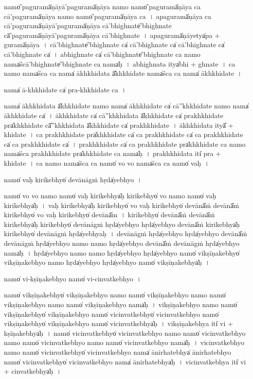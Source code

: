 \documentclass[parskip, DIV=14]{scrartcl}
\begin{document}
{namo̍'pagu॒ramā̍ṇāyā'pagu॒ramā̍ṇāya॒ namo॒ namo̍'pagu॒ramā̍ṇāya ca cā'pagu॒ramā̍ṇāya॒ namo॒ namo̍'pagu॒ramā̍ṇāya ca~। %
a॒pa॒gu॒ramā̍ṇāya ca cā'pagu॒ramā̍ṇāyā'pagu॒ramā̍ṇāya cā'bhi॒ghnate̍'bhighna॒te cā̍'pagu॒ramā̍ṇāyā'pagu॒ramā̍ṇāya cā'bhi॒ghnate~।%
a॒pa॒gu॒ramā̍ṇā॒yetya̍pa + gu॒ramā̍ṇāya~।
cā॒'bhi॒ghna॒te̍'bhighna॒te ca̍ cā'bhighna॒te ca̍ cā'bhighna॒te ca̍ cā'bhighna॒te ca̍~। %
a॒bhi॒ghna॒te ca̍ cā'bhighna॒te̍'bhighna॒te ca॒ namo॒ nama̍ścā'bhighna॒te̍'bhighna॒te ca॒ nama̍ḥ~।
a॒bhi॒ghna॒ta itya̍bhi + ghna॒te~।
ca॒ namo॒ nama̍śca ca॒ nama̍ ākhkhida॒ta ā̎khkhida॒te nama̍śca ca॒ nama̍ ākhkhida॒te~।

nama̍ ā-khkhida॒te ca̍ pra-khkhida॒te ca~।

nama̍ ākhkhida॒ta ā̎khkhida॒te namo॒ nama̍ ākhkhida॒te ca̍ cā''khkhida॒te namo॒ nama̍ ākhkhida॒te ca̍~।
ā॒khkhi॒da॒te ca̍ cā''khkhida॒ta ā̎khkhida॒te ca̍ prakhkhida॒te pra̍khkhida॒te cā̎''khkhida॒ta ā̎khkhida॒te ca̍ prakhkhida॒te~। %
ā॒khkhi॒da॒ta ityā̎ + khi॒da॒te~।
ca॒ pra॒khkhi॒da॒te pra̍khkhida॒te ca̍  ca prakhkhida॒te ca̍ ca prakhkhida॒te ca̍  ca prakhkhida॒te ca̍~।
pra॒khkhi॒da॒te ca̍ ca prakhkhida॒te pra̍khkhida॒te ca॒ namo॒ nama̍śca prakhkhida॒te pra̍khkhida॒te ca॒ nama̍ḥ~।
pra॒khkhi॒da॒ta iti̍ pra + khi॒da॒te~।
ca॒ namo॒ nama̍śca ca॒ namo̍ vo vo॒ nama̍śca ca॒ namo̍ vaḥ~।

namo̍ vaḥ kiri॒kebhyo̍ de॒vānā॒gṁ॒ hṛda̍yebhyo॒~।

namo̍ vo vo॒ namo॒ namo̍ vaḥ kiri॒kebhya̍ḥ kiri॒kebhyo̍ vo॒ namo॒ namo̍ vaḥ kiri॒kebhya̍ḥ~।
va॒ḥ ki॒ri॒kebhya̍ḥ kiri॒kebhyo̍ vo vaḥ kiri॒kebhyo̍ de॒vānā̎ṁ de॒vānā̎ṁ kiri॒kebhyo̍ vo vaḥ kiri॒kebhyo̍ de॒vānā̎m~।
ki॒ri॒kebhyo̍ de॒vānā̎ṁ de॒vānā̎ṁ kiri॒kebhya̍ḥ kiri॒kebhyo̍ de॒vānā॒gṁ॒ hṛda̍yebhyo॒ hṛda̍yebhyo de॒vānā̎ṁ kiri॒kebhya̍ḥ kiri॒kebhyo̍ de॒vānā॒gṁ॒ hṛda̍yebhyaḥ~।
de॒vānā॒gṁ॒ hṛda̍yebhyo॒ hṛda̍yebhyo de॒vānā̎ṁ de॒vānā॒gṁ॒ hṛda̍yebhyo॒ namo॒ namo॒ hṛda̍yebhyo de॒vānā̎ṁ de॒vānā॒gṁ॒ hṛda̍yebhyo॒ nama̍ḥ~।
hṛda̍yebhyo॒ namo॒ namo॒ hṛda̍yebhyo॒ hṛda̍yebhyo॒ namo̍ vikṣīṇa॒kebhyo̍ vikṣīṇa॒kebhyo॒ namo॒ hṛda̍yebhyo॒ hṛda̍yebhyo॒ namo̍ vikṣīṇa॒kebhya̍ḥ~।

namo̍ vi-kṣīṇa॒kebhyo namo̍ vi-cinva॒tkebhyo॒~।

namo̍ vikṣīṇa॒kebhyo̍ vikṣīṇa॒kebhyo॒ namo॒ namo̍ vikṣīṇa॒kebhyo॒ namo॒ namo̍ vikṣīṇa॒kebhyo॒ namo॒ namo̍ vikṣīṇa॒kebhyo॒ nama̍ḥ~।
vi॒kṣī॒ṇa॒kebhyo॒ namo॒ namo̍ vikṣīṇa॒kebhyo̍ vikṣīṇa॒kebhyo॒ namo̍ vicinva॒tkebhyo̍ vicinva॒tkebhyo॒ namo̍ vikṣīṇa॒kebhyo̍ vikṣīṇa॒kebhyo॒ namo̍ vicinva॒tkebhya̍ḥ~।
vi॒kṣī॒ṇa॒kebhya॒ iti̍ vi + kṣī॒ṇa॒kebhya̍ḥ~।
namo̍ vicinva॒tkebhyo̍ vicinva॒tkebhyo॒ namo॒ namo̍ vicinva॒tkebhyo॒ namo॒ namo̍ vicinva॒tkebhyo॒ namo॒ namo̍ vicinva॒tkebhyo॒ nama̍ḥ~।
vi॒ci॒nva॒tkebhyo॒ namo॒ namo̍ vicinva॒tkebhyo̍ vicinva॒tkebhyo॒ nama̍ ānirha॒tebhya̍ ānirha॒tebhyo॒ namo̍ vicinva॒tkebhyo̍ vicinva॒tkebhyo॒ nama̍ ānirha॒tebhya̍ḥ~।
vi॒ci॒nva॒tkebhya॒ iti̍ vi + ci॒nva॒tkebhya̍ḥ~।

}
\end{document}
